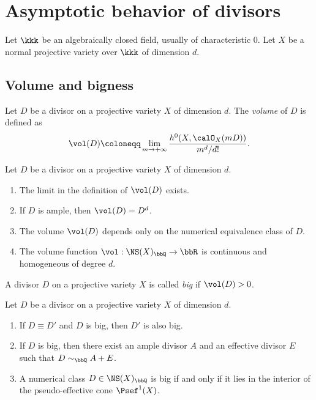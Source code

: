 \section{Asymptotic behavior of divisors}

    Let $\kkk$ be an algebraically closed field, usually of characteristic $0$.
    Let $X$ be a normal projective variety over $\kkk$ of dimension $d$.
    
\subsection{Volume and bigness}

    \begin{definition}
        Let $D$ be a divisor on a projective variety $X$ of dimension $d$.
        The \emph{volume} of $D$ is defined as
        \[ \vol(D) \coloneqq \lim_{m \to +\infty} \frac{h^0(X, \calO_X(mD))}{m^d/d!}. \]
    \end{definition}


    \begin{theorem}
        Let $D$ be a divisor on a projective variety $X$ of dimension $d$.
        \begin{enumerate}
            \item The limit in the definition of $\vol(D)$ exists.
            \item If $D$ is ample, then $\vol(D) = D^d$.
            \item The volume $\vol(D)$ depends only on the numerical equivalence class of $D$.
            \item The volume function $\vol: \NS(X)_\bbQ \to \bbR$ is continuous and homogeneous of degree $d$.
        \end{enumerate}
    \end{theorem}


    \begin{definition}
        A divisor $D$ on a projective variety $X$ is called \emph{big} if $\vol(D) > 0$.
    \end{definition}


    \begin{theorem}
        Let $D$ be a divisor on a projective variety $X$ of dimension $d$.
        \begin{enumerate}
            \item If $D \equiv D'$ and $D$ is big, then $D'$ is also big.
            \item If $D$ is big, then there exist an ample divisor $A$ and an effective divisor $E$ such that $D \sim_\bbQ A + E$.
            \item A numerical class $D \in \NS(X)_\bbQ$ is big if and only if it lies in the interior of the pseudo-effective cone $\Psef^1(X)$.
        \end{enumerate}
    \end{theorem}

